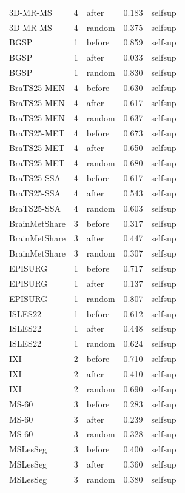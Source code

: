 \begin{tabular}{lrlrl}
3D-MR-MS & 4 & after & 0.183 & selfsup \\
3D-MR-MS & 4 & random & 0.375 & selfsup \\
BGSP & 1 & before & 0.859 & selfsup \\
BGSP & 1 & after & 0.033 & selfsup \\
BGSP & 1 & random & 0.830 & selfsup \\
BraTS25-MEN & 4 & before & 0.630 & selfsup \\
BraTS25-MEN & 4 & after & 0.617 & selfsup \\
BraTS25-MEN & 4 & random & 0.637 & selfsup \\
BraTS25-MET & 4 & before & 0.673 & selfsup \\
BraTS25-MET & 4 & after & 0.650 & selfsup \\
BraTS25-MET & 4 & random & 0.680 & selfsup \\
BraTS25-SSA & 4 & before & 0.617 & selfsup \\
BraTS25-SSA & 4 & after & 0.543 & selfsup \\
BraTS25-SSA & 4 & random & 0.603 & selfsup \\
BrainMetShare & 3 & before & 0.317 & selfsup \\
BrainMetShare & 3 & after & 0.447 & selfsup \\
BrainMetShare & 3 & random & 0.307 & selfsup \\
EPISURG & 1 & before & 0.717 & selfsup \\
EPISURG & 1 & after & 0.137 & selfsup \\
EPISURG & 1 & random & 0.807 & selfsup \\
ISLES22 & 1 & before & 0.612 & selfsup \\
ISLES22 & 1 & after & 0.448 & selfsup \\
ISLES22 & 1 & random & 0.624 & selfsup \\
IXI & 2 & before & 0.710 & selfsup \\
IXI & 2 & after & 0.410 & selfsup \\
IXI & 2 & random & 0.690 & selfsup \\
MS-60 & 3 & before & 0.283 & selfsup \\
MS-60 & 3 & after & 0.239 & selfsup \\
MS-60 & 3 & random & 0.328 & selfsup \\
MSLesSeg & 3 & before & 0.400 & selfsup \\
MSLesSeg & 3 & after & 0.360 & selfsup \\
MSLesSeg & 3 & random & 0.380 & selfsup \\

\end{tabular}
